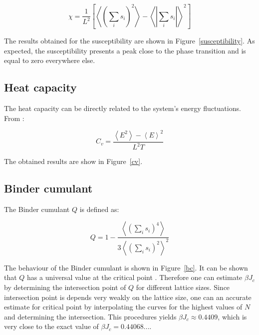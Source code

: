 \documentclass[twoside]{article}
\def\mean#1{\left< #1 \right>}
\begin{document}
\begin{multicols}{2}
\begin{equation}
\chi = \frac{1}{L^2}\left[\mean{\left(\sum_i s_i\right)^2} - \mean{\left|\sum_i s_i \right|}^2\right]
\end{equation}

The results obtained for the susceptibility are shown in Figure~\ref{susceptibility}. As expected, the susceptibility presents a peak close to the phase transition and is equal to zero everywhere else.

\subsection{Heat capacity}
The heat capacity can be directly related to the system's energy fluctuations. From \cite{thijssen}:

\begin{equation}
C_v = \frac{\mean{E^2} - \mean{E}^2}{L^2 T}
\end{equation}

The obtained results are show in Figure~\ref{cv}.

\subsection{Binder cumulant}
The Binder cumulant $Q$ is defined as:

\begin{equation}
Q = 1 - \frac{\mean{\left( \sum_i s_i \right)^4}}{3 \mean{\left( \sum_i s_i \right)^2}^2}
\end{equation}

The behaviour of the Binder cumulant is shown in Figure~\ref{bc}. It can be shown that $Q$ has a universal value at the critical point \cite{lecture_notes}. Therefore one can estimate $\beta J_c$ by determining the intersection point of $Q$ for different lattice sizes. Since intersection point is depends very weakly on the lattice size, one can an accurate estimate for critical point by interpolating the curves for the highest values of $N$ and determining the intersection. This procedures yields $\beta J_c \approx 0.4409$, which is very close to the exact value of $\beta J_c = 0.44068...$.


\end{multicols}
\end{document}
